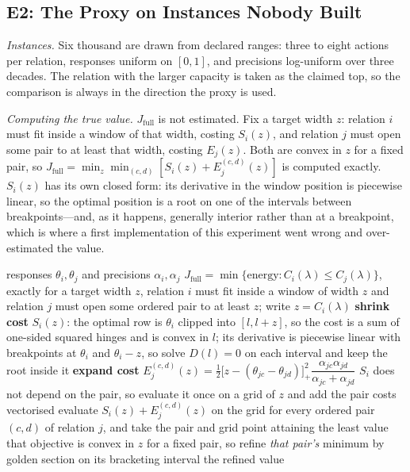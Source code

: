 \documentclass[conference]{IEEEtran}
\theoremstyle{definition}
\begin{document}
\subsection{E2: The Proxy on Instances Nobody Built}
\label{sec:e2}

\emph{Instances.} Six thousand are drawn from declared ranges: three to eight actions per
relation, responses uniform on $[0,1]$, and precisions log-uniform over three decades. The
relation with the larger capacity is taken as the claimed top, so the comparison is always in
the direction the proxy is used.

\emph{Computing the true value.} $J_{\mathrm{full}}$ is not estimated. Fix a target width
$z$: relation $i$ must fit inside a window of that width, costing $S_{i}(z)$, and relation
$j$ must open some pair to at least that width, costing $E_{j}(z)$. Both are convex in $z$
for a fixed pair, so $J_{\mathrm{full}}=\min_{z}\min_{(c,d)}[S_{i}(z)+E^{(c,d)}_{j}(z)]$ is
computed exactly. $S_{i}(z)$ has its own closed form: its derivative in the window position
is piecewise linear, so the optimal position is a root on one of the intervals between
breakpoints---and, as it happens, generally interior rather than at a breakpoint, which is
where a first implementation of this experiment went wrong and over-estimated the value.

\begin{algorithm}[htbp]
\caption{Exact least energy of a capacity-inverting alternative}
\label{alg:jfull}
\begin{algorithmic}[1]
\REQUIRE responses $\theta_{i},\theta_{j}$ and precisions $\alpha_{i},\alpha_{j}$
\ENSURE $J_{\mathrm{full}}=\min\{\text{energy}:C_{i}(\lambda)\le C_{j}(\lambda)\}$, exactly
\STATE for a target width $z$, relation $i$ must fit inside a window of width $z$ and
       relation $j$ must open some ordered pair to at least $z$; write $z=C_{i}(\lambda)$
\STATE \textbf{shrink cost } $S_{i}(z)$: the optimal row is $\theta_{i}$ clipped into
       $[l,l+z]$, so the cost is a sum of one-sided squared hinges and is convex in $l$; its
       derivative is piecewise linear with breakpoints at $\theta_{i}$ and $\theta_{i}-z$,
       so solve $D(l)=0$ on each interval and keep the root inside it
\STATE \textbf{expand cost } $E^{(c,d)}_{j}(z)=\tfrac12\bigl[z-(\theta_{jc}-\theta_{jd})\bigr]_{+}^{2}
       \dfrac{\alpha_{jc}\alpha_{jd}}{\alpha_{jc}+\alpha_{jd}}$
\STATE $S_{i}$ does not depend on the pair, so evaluate it once on a grid of $z$ and add the
       pair costs vectorised
\STATE evaluate $S_{i}(z)+E^{(c,d)}_{j}(z)$ on the grid for every ordered pair $(c,d)$ of
       relation $j$, and take the pair and grid point attaining the least value
\STATE that objective is convex in $z$ for a fixed pair, so refine \emph{that pair's}
       minimum by golden section on its bracketing interval
\RETURN the refined value
\end{algorithmic}
\end{algorithm}
\end{document}
